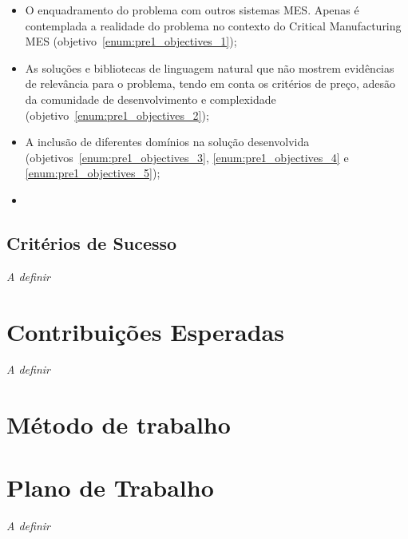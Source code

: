 \begin{itemize}
    \item
    {
        O enquadramento do problema com outros sistemas \gls{MES}. Apenas é contemplada a realidade do problema no contexto do Critical Manufacturing \gls{MES} (objetivo~\ref{enum:pre1_objectives_1});
    }
    \item
    {
        As soluções e bibliotecas de linguagem natural que não mostrem evidências de relevância para o problema, tendo em conta os critérios de preço, adesão da comunidade de desenvolvimento e complexidade (objetivo~\ref{enum:pre1_objectives_2});
    }
    \item 
    {
        A inclusão de diferentes domínios na solução desenvolvida (objetivos~\ref{enum:pre1_objectives_3}, \ref{enum:pre1_objectives_4} e \ref{enum:pre1_objectives_5});
    }
    \item 
    {
        
    }
\end{itemize}



\section{Critérios de Sucesso}
\label{sec:pre1_success_criteria}
\textit{A definir}

\chapter{Contribuições Esperadas}
\label{chap:pre2}
\textit{A definir}

\chapter{Método de trabalho}
\label{chap:pre3}






\chapter{Plano de Trabalho}
\label{chap:pre7}
\textit{A definir}